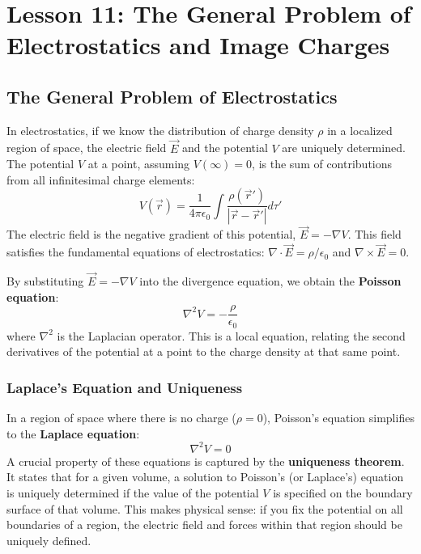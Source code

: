 \section{Lesson 11: The General Problem of Electrostatics and Image Charges}

\subsection{The General Problem of Electrostatics}

In electrostatics, if we know the distribution of charge density $\rho$ in a localized region of space, the electric field $\vec{E}$ and the potential $V$ are uniquely determined. The potential $V$ at a point, assuming $V(\infty)=0$, is the sum of contributions from all infinitesimal charge elements:
\begin{equation*}
 V(\vec{r}) = \frac{1}{4\pi\epsilon_0} \int \frac{\rho(\vec{r}')}{|\vec{r}-\vec{r}'|} d\tau'
\end{equation*}
The electric field is the negative gradient of this potential, $\vec{E} = -\nabla V$. This field satisfies the fundamental equations of electrostatics: $\nabla \cdot \vec{E} = \rho/\epsilon_0$ and $\nabla \times \vec{E} = 0$.

By substituting $\vec{E} = -\nabla V$ into the divergence equation, we obtain the \textbf{Poisson equation}:
\begin{equation*}
 \nabla^2 V = -\frac{\rho}{\epsilon_0}
\end{equation*}
where $\nabla^2$ is the Laplacian operator. This is a local equation, relating the second derivatives of the potential at a point to the charge density at that same point.

\subsubsection{Laplace's Equation and Uniqueness}

In a region of space where there is no charge ($\rho = 0$), Poisson's equation simplifies to the \textbf{Laplace equation}:
\begin{equation*}
 \nabla^2 V = 0
\end{equation*}
A crucial property of these equations is captured by the \textbf{uniqueness theorem}. It states that for a given volume, a solution to Poisson's (or Laplace's) equation is uniquely determined if the value of the potential $V$ is specified on the boundary surface of that volume. This makes physical sense: if you fix the potential on all boundaries of a region, the electric field and forces within that region should be uniquely defined.

